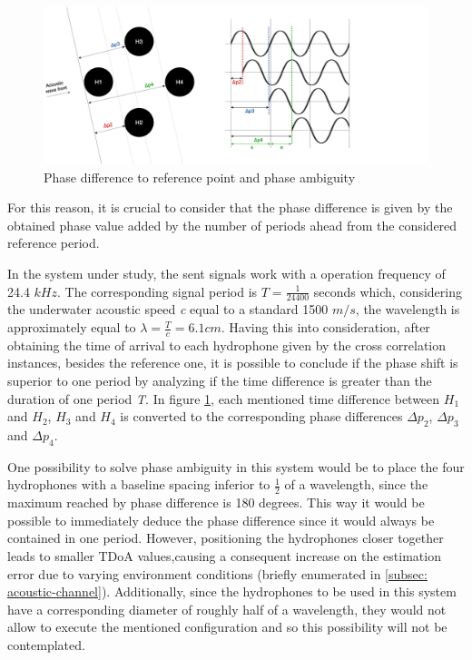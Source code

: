 \begin{figure}[!htbp]
	\centering
	\includegraphics[width=1.2\textwidth]{figures/phase-diff}
	\caption{Phase difference to reference point and phase ambiguity}
	\label{fig:phasediff}
\end{figure}

For this reason, it is crucial to consider that the phase difference is given by the obtained phase value added by the number of periods ahead from the considered reference period.

In the system under study, the sent signals work with a operation frequency of 24.4 $kHz$. The corresponding signal period is $T = \frac{1}{24400} $ seconds which, considering the underwater acoustic speed \textit{c} equal to a standard 1500 $m/s$, the wavelength is approximately equal to $\lambda = \frac{T}{c} = 6.1 cm$. Having this into consideration, after obtaining the time of arrival to each hydrophone given by the cross correlation instances, besides the reference one, it is possible to conclude if the phase shift is superior to one period by analyzing if the time difference is greater than the duration of one period \textit{T}. In figure \ref{fig:phasediff}, each mentioned time difference between $H_1$ and $H_2$, $H_3$ and $H_4$ is converted to the corresponding phase differences $\Delta p_2$, $\Delta p_3$ and $\Delta p_4$.


One possibility to solve phase ambiguity in this system would be to place the four hydrophones with a baseline spacing inferior to $\frac{1}{2}$ of a wavelength, since the maximum reached by phase difference is 180 degrees. This way it would be possible to immediately deduce the phase difference since it would always be contained in one period. However, positioning the hydrophones closer together leads to smaller TDoA values,causing a consequent increase on the estimation error due to varying environment conditions (briefly enumerated in \ref{subsec: acoustic-channel}). Additionally, since the hydrophones to be used in this system have a corresponding diameter of roughly half of a wavelength, they would not allow to execute the mentioned configuration and so this possibility will not be contemplated.


